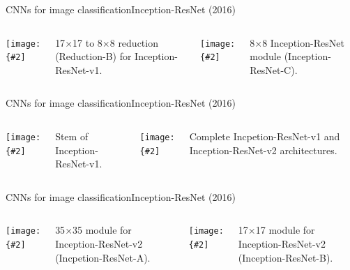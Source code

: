 \documentclass{beamer}
\newcommand{\myfig}[3]{\centerline{\texttt{[image: \{\#2]}}}
\begin{document}
\begin{frame}{CNNs for image classification}{Inception-ResNet (2016)}

  \begin{columns}

    \column{2in}
    
    \myfig{2in}{szegedy-16-fig12}{Szegedy et at.\ (2017), Fig.\ 12}

    \medskip

    17$\times$17 to 8$\times$8 reduction (Reduction-B) for
    Inception-ResNet-v1.

    \column{2in}
    
    \myfig{1.8in}{szegedy-16-fig13}{Szegedy et at.\ (2017), Fig.\ 13}

    \medskip
    
    8$\times$8 Inception-ResNet module (Inception-ResNet-C).
    
  \end{columns}
  
\end{frame}


\begin{frame}{CNNs for image classification}{Inception-ResNet (2016)}

  \begin{columns}

    \column{1.3in}
    
    \myfig{1in}{szegedy-16-fig14}{Szegedy et at.\ (2017), Fig.\ 14}

    \column{0.9in}
    
    Stem of Inception-ResNet-v1.

    \column{1.2in}
    
    \myfig{1.1in}{szegedy-16-fig15}{Szegedy et at.\ (2017), Fig.\ 15}

    \column{0.9in}
    
    Complete Incpetion-ResNet-v1 and Inception-ResNet-v2 architectures.
    
  \end{columns}
  
\end{frame}


\begin{frame}{CNNs for image classification}{Inception-ResNet (2016)}

  \begin{columns}

    \column{2in}
    
    \myfig{2in}{szegedy-16-fig16}{Szegedy et at.\ (2017), Fig.\ 16}

    \medskip

    35$\times$35 module for
    Inception-ResNet-v2 (Incpetion-ResNet-A).

    \column{2in}
    
    \myfig{1.6in}{szegedy-16-fig17}{Szegedy et at.\ (2017), Fig.\ 17}

    \medskip
    
    17$\times$17 module for Inception-ResNet-v2 (Inception-ResNet-B).
    
  \end{columns}
  
\end{frame}
\end{document}
